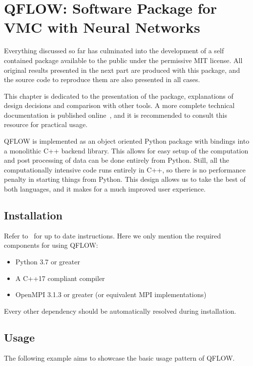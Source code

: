 \documentclass[Thesis.tex]{subfiles}
\begin{document}
\chapter{QFLOW: Software Package for VMC with Neural Networks}
\label{chp:qflow}

\glsresetall

Everything discussed so far has culminated into the development of a self
contained package available to the public under the permissive MIT license. All
original results presented in the next part are produced with this package, and
the source code to reproduce them are also presented in all cases.

This chapter is dedicated to the presentation of the package, explanations of
design decisions and comparison with other tools. A more complete technical
documentation is published online~\cite{qflow}, and it is recommended to consult this
resource for practical usage.

QFLOW is implemented as an object oriented Python package with bindings into a monolithic C++
backend library. This allows for easy setup of the computation and post
processing of data can be done entirely from Python. Still, all the
computationally intensive code runs entirely in C++, so there is no performance
penalty in starting things from Python. This design allows us to take the best
of both languages, and it makes for a much improved user experience.

\section{Installation}

Refer to~\cite{qflow} for up to date instructions. Here we only mention the
required components for using QFLOW:

\begin{itemize}
  \item Python 3.7 or greater
  \item A C++17 compliant compiler
  \item OpenMPI 3.1.3 or greater (or equivalent MPI implementations)
\end{itemize}
Every other dependency should be automatically resolved during installation.

\section{Usage}

The following example aims to showcase the basic usage pattern of QFLOW.
\end{document}
